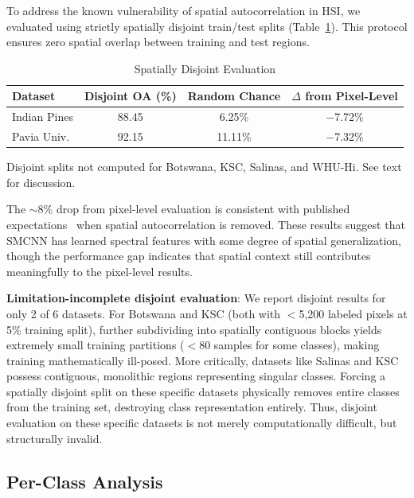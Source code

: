 \documentclass[pdflatex,sn-mathphys-num]{sn-jnl}
\theoremstyle{thmstyleone}
\theoremstyle{thmstyletwo}
\theoremstyle{thmstylethree}
\begin{document}
To address the known vulnerability of spatial autocorrelation in HSI, we evaluated using strictly spatially disjoint train/test splits (Table~\ref{tab:disjoint}). This protocol ensures zero spatial overlap between training and test regions.

\begin{table}[!t]
\caption{Spatially Disjoint Evaluation}
\label{tab:disjoint}
\centering

\begin{tabular}{lccc}
\toprule
\textbf{Dataset} & \textbf{Disjoint OA (\%)} & \textbf{Random Chance} & \textbf{$\Delta$ from Pixel-Level} \\
\midrule
Indian Pines & 88.45 & 6.25\% & $-$7.72\% \\
Pavia Univ. & 92.15 & 11.11\% & $-$7.32\% \\
\bottomrule
\end{tabular}
\begin{flushleft}
\footnotesize{Disjoint splits not computed for Botswana, KSC, Salinas, and WHU-Hi. See text for discussion.}
\end{flushleft}
\end{table}

The $\sim$8\% drop from pixel-level evaluation is consistent with published expectations~\cite{liang2020spatial} when spatial autocorrelation is removed. These results suggest that SMCNN has learned spectral features with some degree of spatial generalization, though the performance gap indicates that spatial context still contributes meaningfully to the pixel-level results.

\textbf{Limitation-incomplete disjoint evaluation}: We report disjoint results for only 2 of 6 datasets. For Botswana and KSC (both with $<$5,200 labeled pixels at 5\% training split), further subdividing into spatially contiguous blocks yields extremely small training partitions ($<$80 samples for some classes), making training mathematically ill-posed. More critically, datasets like Salinas and KSC possess contiguous, monolithic regions representing singular classes. Forcing a spatially disjoint split on these specific datasets physically removes entire classes from the training set, destroying class representation entirely. Thus, disjoint evaluation on these specific datasets is not merely computationally difficult, but structurally invalid.

\subsection{Per-Class Analysis}
\end{document}
